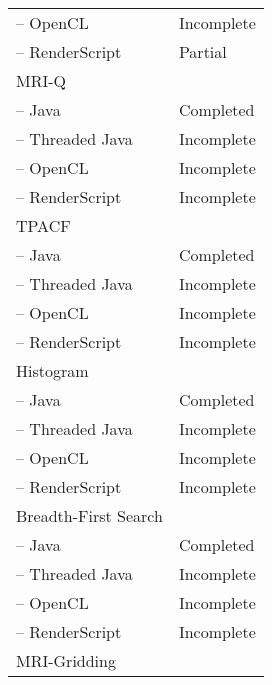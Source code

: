 \begin{table}[h]
\begin{tabular}{ | l | p{2cm} |}
    \hspace{0.5cm}-- OpenCL & Incomplete \\
    \hspace{0.5cm}-- RenderScript & Partial \\ \hline
    MRI-Q & \\
    \hspace{0.5cm}-- Java & Completed \\
    \hspace{0.5cm}-- Threaded Java & Incomplete \\
    \hspace{0.5cm}-- OpenCL & Incomplete \\
    \hspace{0.5cm}-- RenderScript & Incomplete \\ \hline
    TPACF & \\
    \hspace{0.5cm}-- Java & Completed \\
    \hspace{0.5cm}-- Threaded Java & Incomplete \\
    \hspace{0.5cm}-- OpenCL & Incomplete \\
    \hspace{0.5cm}-- RenderScript & Incomplete \\ \hline
    Histogram & \\
    \hspace{0.5cm}-- Java & Completed \\
    \hspace{0.5cm}-- Threaded Java & Incomplete \\
    \hspace{0.5cm}-- OpenCL & Incomplete \\
    \hspace{0.5cm}-- RenderScript & Incomplete \\ \hline
    Breadth-First Search & \\
    \hspace{0.5cm}-- Java & Completed \\
    \hspace{0.5cm}-- Threaded Java & Incomplete \\
    \hspace{0.5cm}-- OpenCL & Incomplete \\
    \hspace{0.5cm}-- RenderScript & Incomplete \\ \hline
    MRI-Gridding & \\

\end{tabular}
\end{table}
